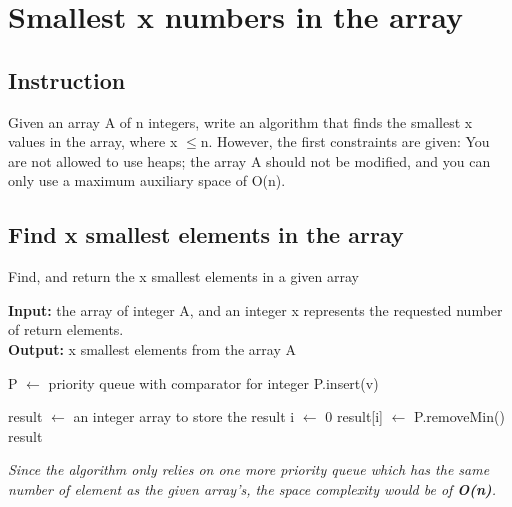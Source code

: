\section{Smallest x numbers in the array}
\subsection{Instruction}
Given an array A of n integers, write an algorithm that finds the smallest x values in the array,
where x $\leq$n. However, the first constraints are given: You are not allowed to use heaps; the array
A should not be modified, and you can only use a maximum auxiliary space of O(n). 

\subsection{Find x smallest elements in the array}
\begin{algorithm}[H]
\caption{Find, and return the x smallest elements in a given array}
\textbf{Input:} the array of integer A, and an integer x represents the requested number of return elements.
\\
\textbf{Output:} x smallest elements from the array A
\begin{algorithmic}[1]
\State P $\leftarrow$ priority queue with comparator for integer
\State P.insert(v)
\EndFor

\State result $\leftarrow$ an integer array to store the result
\State i $\leftarrow$ 0
\State result[i] $\leftarrow$ P.removeMin()
\EndWhile
\State \Return result
\EndProcedure
\end{algorithmic}
\end{algorithm}

\textit{Since the algorithm only relies on one more priority queue which has the same number of element as the given array's, the space complexity would be of \textbf{O(n)}.}


